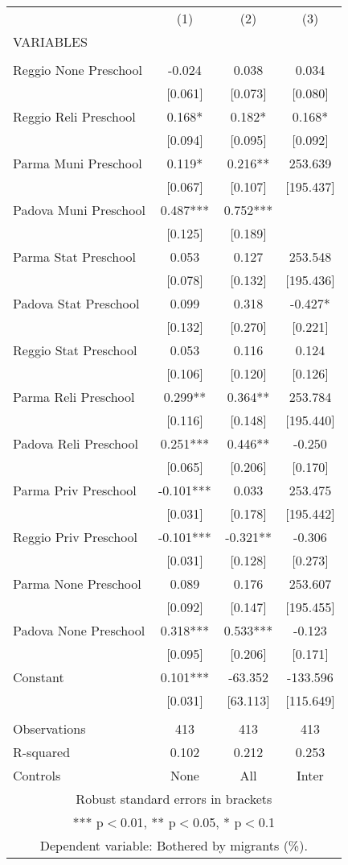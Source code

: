 \begin{tabular}{lccc} \hline
 & (1) & (2) & (3) \\
VARIABLES &  &  &  \\ \hline
 &  &  &  \\
Reggio None Preschool & -0.024 & 0.038 & 0.034 \\
 & [0.061] & [0.073] & [0.080] \\
Reggio Reli Preschool & 0.168* & 0.182* & 0.168* \\
 & [0.094] & [0.095] & [0.092] \\
Parma Muni Preschool & 0.119* & 0.216** & 253.639 \\
 & [0.067] & [0.107] & [195.437] \\
Padova Muni Preschool & 0.487*** & 0.752*** &  \\
 & [0.125] & [0.189] &  \\
Parma Stat Preschool & 0.053 & 0.127 & 253.548 \\
 & [0.078] & [0.132] & [195.436] \\
Padova Stat Preschool & 0.099 & 0.318 & -0.427* \\
 & [0.132] & [0.270] & [0.221] \\
Reggio Stat Preschool & 0.053 & 0.116 & 0.124 \\
 & [0.106] & [0.120] & [0.126] \\
Parma Reli Preschool & 0.299** & 0.364** & 253.784 \\
 & [0.116] & [0.148] & [195.440] \\
Padova Reli Preschool & 0.251*** & 0.446** & -0.250 \\
 & [0.065] & [0.206] & [0.170] \\
Parma Priv Preschool & -0.101*** & 0.033 & 253.475 \\
 & [0.031] & [0.178] & [195.442] \\
Reggio Priv Preschool & -0.101*** & -0.321** & -0.306 \\
 & [0.031] & [0.128] & [0.273] \\
Parma None Preschool & 0.089 & 0.176 & 253.607 \\
 & [0.092] & [0.147] & [195.455] \\
Padova None Preschool & 0.318*** & 0.533*** & -0.123 \\
 & [0.095] & [0.206] & [0.171] \\
Constant & 0.101*** & -63.352 & -133.596 \\
 & [0.031] & [63.113] & [115.649] \\
 &  &  &  \\
Observations & 413 & 413 & 413 \\
R-squared & 0.102 & 0.212 & 0.253 \\
 Controls & None & All & Inter \\ \hline
\multicolumn{4}{c}{ Robust standard errors in brackets} \\
\multicolumn{4}{c}{ *** p$<$0.01, ** p$<$0.05, * p$<$0.1} \\
\multicolumn{4}{c}{ Dependent variable: Bothered by migrants (\%).} \\
\end{tabular}

